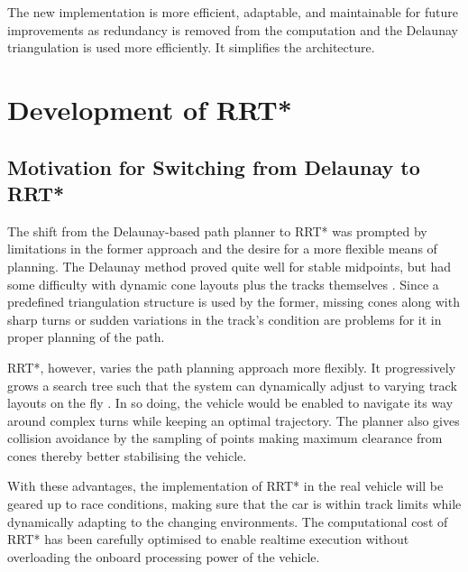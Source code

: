 \documentclass[a4paper,11pt]{report}
\begin{document}
The new implementation is more efficient, adaptable, and maintainable for
future improvements as redundancy is removed from the computation and the
Delaunay triangulation is used more efficiently. It simplifies the architecture.

\section{Development of RRT*}
\subsection{Motivation for Switching from Delaunay to RRT*}

The shift from the Delaunay-based path planner to RRT* was prompted by limitations in the former
approach and the desire for a more flexible means of planning. The Delaunay method
proved quite well for stable midpoints, but had some difficulty with dynamic cone layouts plus
the tracks themselves \cite{reference6}. Since a predefined triangulation structure is used by the former,
missing cones along with sharp turns or sudden variations in the track's condition are
problems for it in proper planning of the path.

RRT*, however, varies the path
planning approach more flexibly. It progressively grows a search tree such that the
system can dynamically adjust to varying track layouts on the fly \cite{reference4}. In so doing, the
vehicle would be enabled to navigate its way around complex turns while keeping
an optimal trajectory. The planner also gives collision avoidance by the sampling
of points making maximum clearance from cones thereby better stabilising the vehicle.

With these advantages, the implementation of RRT* in the real vehicle will be geared up to
race conditions, making sure that the car is within track limits while dynamically adapting to
the changing environments. The computational cost of RRT* has been carefully optimised to enable 
realtime execution without overloading the onboard processing power of the vehicle.
\end{document}
